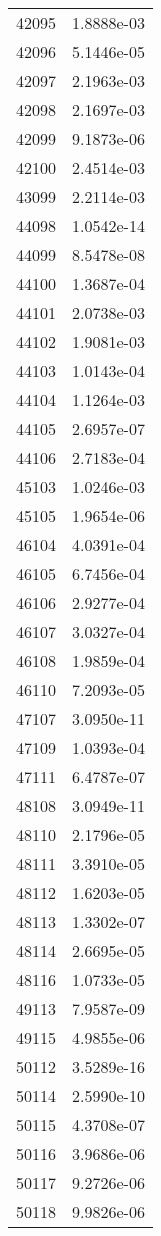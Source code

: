 \begin{table}[h!]
\begin{tabular}{|| c || c |}
42095 & 1.8888e-03 \\
42096 & 5.1446e-05 \\
42097 & 2.1963e-03 \\
42098 & 2.1697e-03 \\
42099 & 9.1873e-06 \\
42100 & 2.4514e-03 \\
43099 & 2.2114e-03 \\
44098 & 1.0542e-14 \\
44099 & 8.5478e-08 \\
44100 & 1.3687e-04 \\
44101 & 2.0738e-03 \\
44102 & 1.9081e-03 \\
44103 & 1.0143e-04 \\
44104 & 1.1264e-03 \\
44105 & 2.6957e-07 \\
44106 & 2.7183e-04 \\
45103 & 1.0246e-03 \\
45105 & 1.9654e-06 \\
46104 & 4.0391e-04 \\
46105 & 6.7456e-04 \\
46106 & 2.9277e-04 \\
46107 & 3.0327e-04 \\
46108 & 1.9859e-04 \\
46110 & 7.2093e-05 \\
47107 & 3.0950e-11 \\
47109 & 1.0393e-04 \\
47111 & 6.4787e-07 \\
48108 & 3.0949e-11 \\
48110 & 2.1796e-05 \\
48111 & 3.3910e-05 \\
48112 & 1.6203e-05 \\
48113 & 1.3302e-07 \\
48114 & 2.6695e-05 \\
48116 & 1.0733e-05 \\
49113 & 7.9587e-09 \\
49115 & 4.9855e-06 \\
50112 & 3.5289e-16 \\
50114 & 2.5990e-10 \\
50115 & 4.3708e-07 \\
50116 & 3.9686e-06 \\
50117 & 9.2726e-06 \\
50118 & 9.9826e-06 \\

\end{tabular}
\end{table}
